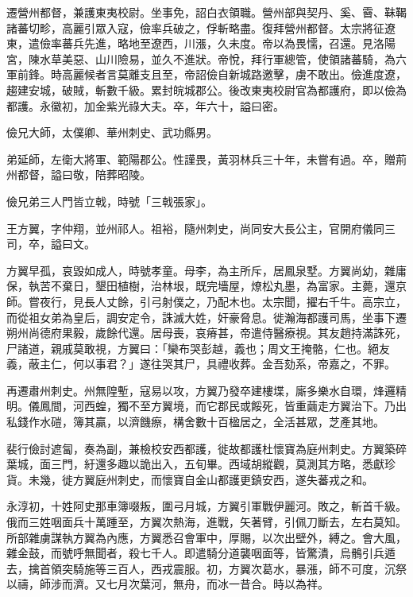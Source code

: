 \begin{pinyinscope}
 遷營州都督，兼護東夷校尉。坐事免，詔白衣領職。營州部與契丹、奚、霫、靺鞨諸蕃切畛，高麗引眾入寇，儉率兵破之，俘斬略盡。復拜營州都督。太宗將征遼東，遣儉率蕃兵先進，略地至遼西，川漲，久未度。帝以為畏懦，召還。見洛陽宮，陳水草美惡、山川險易，並久不進狀。帝悅，拜行軍總管，使領諸蕃騎，為六軍前鋒。時高麗候者言莫離支且至，帝詔儉自新城路邀擊，虜不敢出。儉進度遼，趨建安城，破賊，斬數千級。累封皖城郡公。後改東夷校尉官為都護府，即以儉為都護。永徽初，加金紫光祿大夫。卒，年六十，謚曰密。



 儉兄大師，太僕卿、華州刺史、武功縣男。



 弟延師，左衛大將軍、範陽郡公。性謹畏，黃羽林兵三十年，未嘗有過。卒，贈荊州都督，謚曰敬，陪葬昭陵。



 儉兄弟三人門皆立戟，時號「三戟張家」。



 王方翼，字仲翔，並州祁人。祖裕，隨州刺史，尚同安大長公主，官開府儀同三司，卒，謚曰文。



 方翼早孤，哀毀如成人，時號孝童。母李，為主所斥，居鳳泉墅。方翼尚幼，雜庸保，執苦不棄日，墾田植樹，治林垠，既完墻屋，燎松丸墨，為富家。主薨，還京師。嘗夜行，見長人丈餘，引弓射僕之，乃配木也。太宗聞，擢右千牛。高宗立，而從祖女弟為皇后，調安定令，誅滅大姓，奸豪脅息。徙瀚海都護司馬，坐事下遷朔州尚德府果毅，歲餘代還。居母喪，哀瘠甚，帝遣侍醫療視。其友趙持滿誅死，尸諸道，親戚莫敢視，方翼曰：「欒布哭彭越，義也；周文王掩骼，仁也。絕友義，蔽主仁，何以事君？」遂往哭其尸，具禮收葬。金吾劾系，帝嘉之，不罪。



 再遷肅州刺史。州無隍塹，寇易以攻，方翼乃發卒建樓堞，廝多樂水自環，烽邏精明。儀鳳間，河西蝗，獨不至方翼境，而它郡民或餒死，皆重繭走方翼治下。乃出私錢作水磑，簿其贏，以濟饑瘵，構舍數十百楹居之，全活甚眾，芝產其地。



 裴行儉討遮匐，奏為副，兼檢校安西都護，徙故都護杜懷寶為庭州刺史。方翼築碎葉城，面三門，紆還多趣以詭出入，五旬畢。西域胡縱觀，莫測其方略，悉獻珍貨。未幾，徙方翼庭州刺史，而懷寶自金山都護更鎮安西，遂失蕃戎之和。



 永淳初，十姓阿史那車簿啜叛，圍弓月城，方翼引軍戰伊麗河。敗之，斬首千級。俄而三姓咽面兵十萬踵至，方翼次熱海，進戰，矢著臂，引佩刀斷去，左右莫知。所部雜虜謀執方翼為內應，方翼悉召會軍中，厚賜，以次出壁外，縛之。會大風，雜金鼓，而號呼無聞者，殺七千人。即遣騎分道襲咽面等，皆驚潰，烏鶻引兵遁去，擒首領突騎施等三百人，西戎震服。初，方翼次葛水，暴漲，師不可度，沉祭以禱，師涉而濟。又七月次葉河，無舟，而冰一昔合。時以為祥。




\end{pinyinscope}
